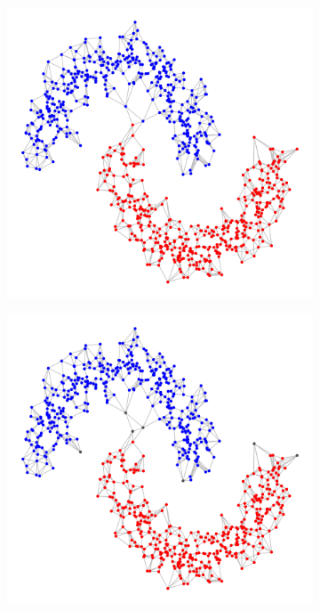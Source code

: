 \documentclass{article}
\newcommand{\1}{\mathbf{1}}
\theoremstyle{aldenthm}
\theoremstyle{aldenrmrk}
\begin{document}
\begin{figure}
\begin{adjustbox}{minipage=\linewidth,scale=0.8}
\begin{subfigure}{.24\linewidth}
		\caption{}
	\end{subfigure}
	\begin{subfigure}{.24\linewidth}
		\includegraphics[width=\linewidth]{example2plots/row1_conductance_cluster}
		\caption{}
	\end{subfigure}
	\begin{subfigure}{.24\linewidth}
		\includegraphics[width=\linewidth]{example2plots/row1_density_cluster}
		\caption{}
	\end{subfigure}
	

\end{adjustbox}
\end{figure}
\end{document}
